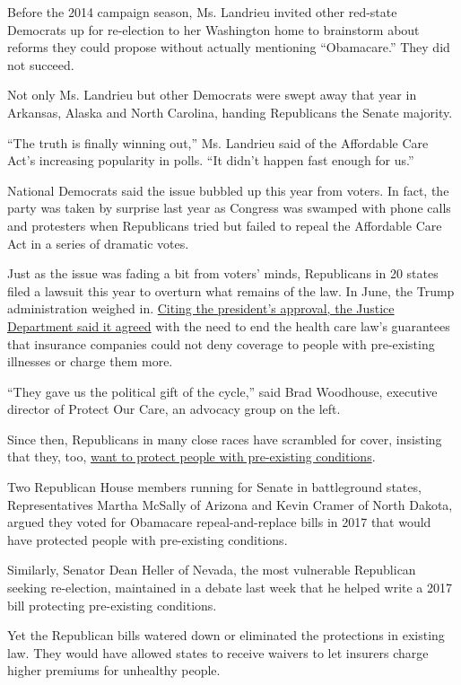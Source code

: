 Before the 2014 campaign season, Ms. Landrieu invited other red-state
Democrats up for re-election to her Washington home to brainstorm about
reforms they could propose without actually mentioning ``Obamacare.''
They did not succeed.

Not only Ms. Landrieu but other Democrats were swept away that year in
Arkansas, Alaska and North Carolina, handing Republicans the Senate
majority.

``The truth is finally winning out,'' Ms. Landrieu said of the
Affordable Care Act's increasing popularity in polls. ``It didn't happen
fast enough for us.''

National Democrats said the issue bubbled up this year from voters. In
fact, the party was taken by surprise last year as Congress was swamped
with phone calls and protesters when Republicans tried but failed to
repeal the Affordable Care Act in a series of dramatic votes.

Just as the issue was fading a bit from voters' minds, Republicans in 20
states filed a lawsuit this year to overturn what remains of the law. In
June, the Trump administration weighed in.
\href{https://www.justice.gov/file/1069806/download}{Citing the
president's approval, the Justice Department said it agreed} with the
need to end the health care law's guarantees that insurance companies
could not deny coverage to people with pre-existing illnesses or charge
them more.

``They gave us the political gift of the cycle,'' said Brad Woodhouse,
executive director of Protect Our Care, an advocacy group on the left.

Since then, Republicans in many close races have scrambled for cover,
insisting that they, too,
\href{https://www.nytimes.com/2018/10/16/upshot/republicans-health-care-ads-midterms.html}{want
to protect people with pre-existing conditions}.

Two Republican House members running for Senate in battleground states,
Representatives Martha McSally of Arizona and Kevin Cramer of North
Dakota, argued they voted for Obamacare repeal-and-replace bills in 2017
that would have protected people with pre-existing conditions.

Similarly, Senator Dean Heller of Nevada, the most vulnerable Republican
seeking re-election, maintained in a debate last week that he helped
write a 2017 bill protecting pre-existing conditions.

Yet the Republican bills watered down or eliminated the protections in
existing law. They would have allowed states to receive waivers to let
insurers charge higher premiums for unhealthy people.

